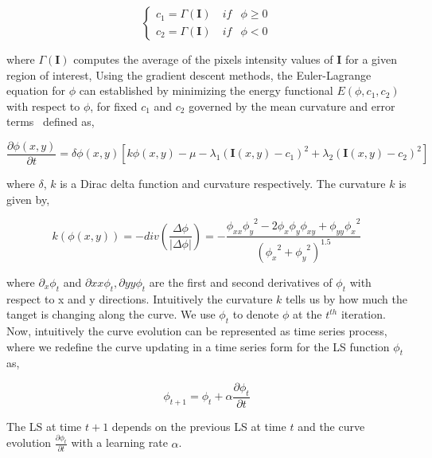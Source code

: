 \documentclass{WitsPhysicsReport}
\begin{document}
\[ \begin{cases} 
      c_{1} = \Gamma(\mathbf{I}) \quad if & \phi \geq 0  \\
      c_{2} = \Gamma(\mathbf{I})   \quad if & \phi <   0
  \end{cases}
\]


where $\Gamma(\mathbf{I})$ computes the average of the pixels intensity values of $\mathbf{I}$ for a given region of interest, Using the gradient descent methods, the Euler-Lagrange equation for $\phi$ can established by minimizing the energy functional $E(\phi,c_{1},c_{2})$ with respect to $\phi$, for fixed $c_{1}$ and $c_{2}$ governed by the mean curvature and error terms~\cite{caselles1993geometric,celik2010multitemporal} defined as,

\begin{equation}
\frac{\partial \phi (x,y)}{\partial t} =  \delta \phi (x,y) [k \phi (x,y)  - \mu - \lambda_{1}(\mathbf{I}(x,y) -c_{1})^{2} + \lambda_{2}(\mathbf{I}(x,y) -c_{2})^{2} ]
\label{equ:levelset_derivative}
\end{equation}

where $\delta$, $k$ is a Dirac delta function and curvature respectively. The curvature $k$ is given by,


\begin{equation}
k(\phi (x,y)) = - div(\frac{\Delta \phi}{|\Delta \phi|}) = - \frac{\phi_{xx} {\phi_{y}}^{2} - 2\phi_{x} \phi_{y} \phi_{xy} + \phi_{yy} {\phi_{x}}^{2} } { ({\phi_{x}}^{2} + {\phi_{y}}^{2})^{1.5}}
\label{equ:curvature}
\end{equation}

where $\partial_{x} \phi_{t}$ and $\partial{xx} \phi_{t}, \partial{yy} \phi_{t}$ are the first and second derivatives of $\phi_{t}$ with respect to x and y directions. Intuitively the curvature $k$ tells us by how much the tanget is changing along the curve. We use $\phi_{t}$ to denote $\phi$ at the $t^{th}$ iteration. Now, intuitively the curve evolution can be represented as time series process, where we redefine the curve updating in a time series form for the LS function $\phi_{t}$ as,


\begin{equation}
\phi_{t+1} = \phi_{t} + \alpha \frac{\partial \phi_{t}}{\partial t}
\label{equ:curve_evolution}
\end{equation}



The LS at time $t+1$ depends on the previous LS at time $t$ and the curve evolution $\frac{\partial \phi_{t}}{\partial t}$ with a learning rate $\alpha$.
\end{document}

